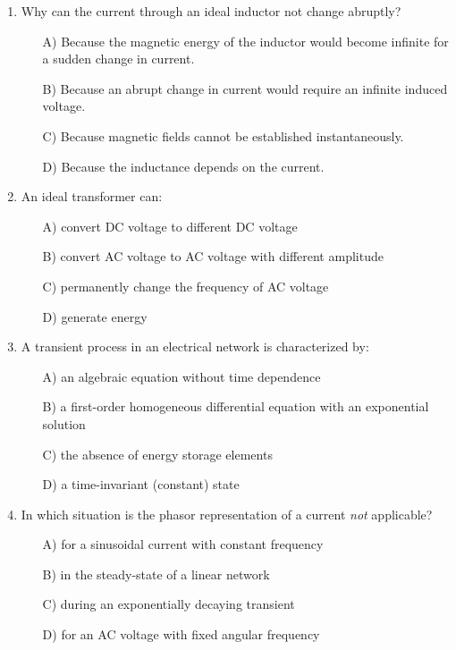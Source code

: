 \documentclass[a4paper,12pt]{article}
\newif\ifshowsolutions
\begin{document}
\begin{enumerate}[label=\textbf{\arabic*.}, leftmargin=*, itemsep=8pt]
\ifshowsolutions
Solution: A
\fi

  \item Why can the current through an ideal inductor not change abruptly?
    \begin{itemize}[label=$\square$]
      \item[A)] Because the magnetic energy of the inductor would become infinite for a sudden change in current.
      \item[B)] Because an abrupt change in current would require an infinite induced voltage.
      \item[C)] Because magnetic fields cannot be established instantaneously.
      \item[D)] Because the inductance depends on the current.
    \end{itemize}

\ifshowsolutions
Solution: B
\fi

  \item An ideal transformer can:
    \begin{itemize}[label=$\square$]
      \item[A)] convert DC voltage to different DC voltage
      \item[B)] convert AC voltage to AC voltage with different amplitude
      \item[C)] permanently change the frequency of AC voltage
      \item[D)] generate energy
    \end{itemize}

\ifshowsolutions
Solution: B
\fi

  \item A transient process in an electrical network is characterized by:
    \begin{itemize}[label=$\square$]
      \item[A)] an algebraic equation without time dependence
      \item[B)] a first-order homogeneous differential equation with an exponential solution
      \item[C)] the absence of energy storage elements
      \item[D)] a time-invariant (constant) state
    \end{itemize}

\ifshowsolutions
Solution: B
\fi

  \item In which situation is the phasor representation of a current \emph{not} applicable?
    \begin{itemize}[label=$\square$]
      \item[A)] for a sinusoidal current with constant frequency
      \item[B)] in the steady-state of a linear network
      \item[C)] during an exponentially decaying transient
      \item[D)] for an AC voltage with fixed angular frequency
    \end{itemize}


\end{enumerate}
\end{document}
